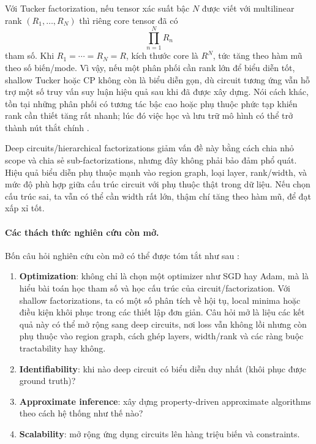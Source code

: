 Với Tucker factorization, nếu tensor xác suất bậc $N$ được viết với multilinear rank
$(R_1,\ldots,R_N)$ thì riêng core tensor đã có
\begin{equation}
    \prod_{n=1}^{N} R_n
\end{equation}
tham số.  Khi $R_1=\cdots=R_N=R$, kích thước core là $R^N$, tức tăng theo hàm mũ theo
số biến/mode.  Vì vậy, nếu một phân phối cần rank lớn để biểu diễn tốt, shallow
Tucker hoặc CP không còn là biểu diễn gọn, dù circuit tương ứng vẫn hỗ trợ một số
truy vấn suy luận hiệu quả sau khi đã được xây dựng.  Nói cách khác, tồn tại những
phân phối có tương tác bậc cao hoặc phụ thuộc phức tạp khiến rank cần thiết tăng rất
nhanh; lúc đó việc học và lưu trữ mô hình có thể trở thành nút thắt chính
\cite{loconte2025relationship}.

Deep circuits/hierarchical factorizations giảm vấn đề này bằng cách chia nhỏ scope và
chia sẻ sub-factorizations, nhưng đây không phải bảo đảm phổ quát.  Hiệu quả biểu
diễn phụ thuộc mạnh vào region graph, loại layer, rank/width, và mức độ phù hợp giữa
cấu trúc circuit với phụ thuộc thật trong dữ liệu.  Nếu chọn cấu trúc sai, ta vẫn có
thể cần width rất lớn, thậm chí tăng theo hàm mũ, để đạt xấp xỉ tốt.

\paragraph{Các thách thức nghiên cứu còn mở.}
Bốn câu hỏi nghiên cứu còn mở có thể được tóm tắt như sau
\cite{chrysos2025foundationsTutorial}:
\begin{enumerate}[label=\textbf{\arabic*.}, leftmargin=2em]
    \item \textbf{Optimization}: không chỉ là chọn một optimizer như SGD hay Adam,
    mà là hiểu bài toán học tham số và học cấu trúc của circuit/factorization.  Với
    shallow factorizations, ta có một số phân tích về hội tụ, local minima hoặc điều
    kiện khôi phục trong các thiết lập đơn giản.  Câu hỏi mở là liệu các kết quả này
    có thể mở rộng sang deep circuits, nơi loss vẫn không lồi nhưng còn phụ thuộc vào
    region graph, cách ghép layers, width/rank và các ràng buộc tractability hay
    không.
    \item \textbf{Identifiability}: khi nào deep circuit có biểu diễn duy nhất
    (khôi phục được ground truth)?
    \item \textbf{Approximate inference}: xây dựng property-driven approximate
    algorithms theo cách hệ thống như thế nào?
    \item \textbf{Scalability}: mở rộng ứng dụng circuits lên hàng triệu biến và
    constraints.
\end{enumerate}

